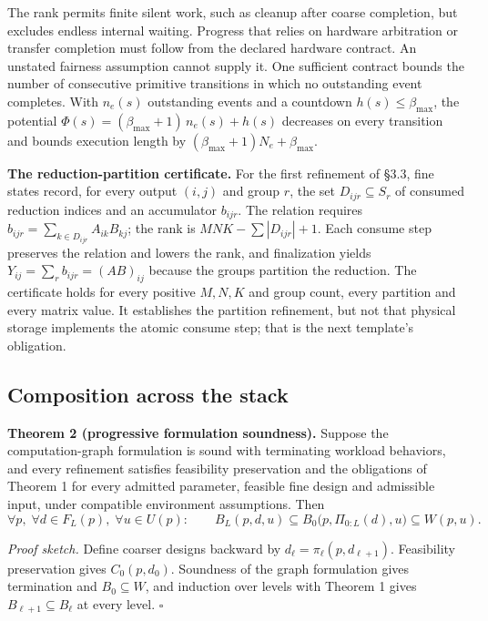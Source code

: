 \documentclass[11pt]{article}
\begin{document}
The rank permits finite silent work, such as cleanup after coarse completion, but excludes endless internal waiting. Progress that relies on hardware arbitration or transfer completion must follow from the declared hardware contract. An unstated fairness assumption cannot supply it. One sufficient contract bounds the number of consecutive primitive transitions in which no outstanding event completes. With \(n_e(s)\) outstanding events and a countdown \(h(s)\le\beta_{\max}\), the potential \(\Phi(s)=(\beta_{\max}+1)\,n_e(s)+h(s)\) decreases on every transition and bounds execution length by \((\beta_{\max}+1)N_e+\beta_{\max}\).

\textbf{The reduction-partition certificate.} For the first refinement of §3.3, fine states record, for every output \((i,j)\) and group \(r\), the set \(D_{ijr}\subseteq S_r\) of consumed reduction indices and an accumulator \(b_{ijr}\). The relation requires \(b_{ijr}=\sum_{k\in D_{ijr}}A_{ik}B_{kj}\); the rank is \(MNK-\sum|D_{ijr}|+1\). Each consume step preserves the relation and lowers the rank, and finalization yields \(Y_{ij}=\sum_r b_{ijr}=(AB)_{ij}\) because the groups partition the reduction. The certificate holds for every positive \(M,N,K\) and group count, every partition and every matrix value. It establishes the partition refinement, but not that physical storage implements the atomic consume step; that is the next template's obligation.

\hypertarget{composition-across-the-stack}{%
\subsection{Composition across the stack}\label{composition-across-the-stack}}

\textbf{Theorem 2 (progressive formulation soundness).} Suppose the computation-graph formulation is sound with terminating workload behaviors, and every refinement satisfies feasibility preservation and the obligations of Theorem 1 for every admitted parameter, feasible fine design and admissible input, under compatible environment assumptions. Then
\[
\forall p,\;\forall d\in F_L(p),\;\forall u\in U(p):\qquad B_L(p,d,u)\subseteq B_0\bigl(p,\Pi_{0:L}(d),u\bigr)\subseteq W(p,u).
\]

\emph{Proof sketch.} Define coarser designs backward by \(d_\ell=\pi_\ell(p,d_{\ell+1})\). Feasibility preservation gives \(C_0(p,d_0)\). Soundness of the graph formulation gives termination and \(B_0\subseteq W\), and induction over levels with Theorem 1 gives \(B_{\ell+1}\subseteq B_\ell\) at every level. \(\square\)
\end{document}
